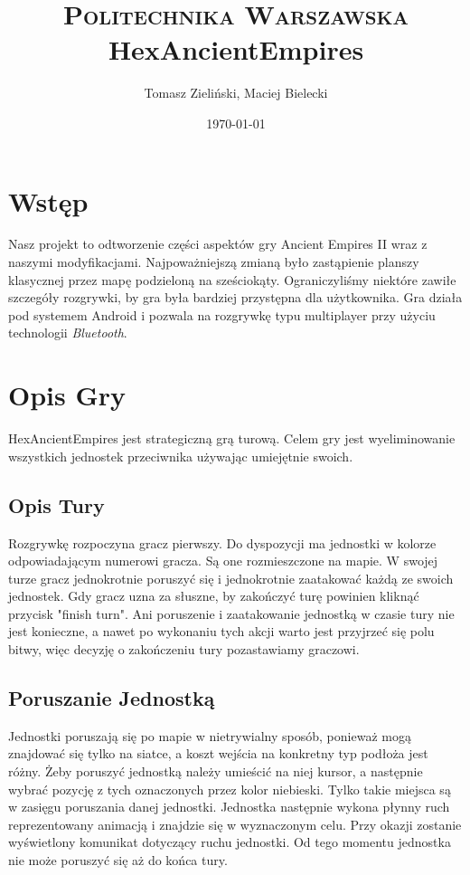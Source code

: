 \documentclass[paper=a4, fontsize=11pt]{scrartcl} %
\title{	
\normalfont \normalsize 
\textsc{Politechnika Warszawska} \\ [25pt] %
\huge HexAncientEmpires \\ %
}
\author{Tomasz Zieliński,  Maciej Bielecki}
\date{\normalsize\today}
\numberwithin{equation}{section} %
\numberwithin{figure}{section} %
\numberwithin{table}{section} %
\begin{document}
\maketitle 

\section{Wstęp}
Nasz projekt to odtworzenie części aspektów gry Ancient Empires II wraz z naszymi modyfikacjami. Najpoważniejszą zmianą było zastąpienie planszy klasycznej przez mapę podzieloną na sześciokąty. Ograniczyliśmy niektóre zawiłe szczegóły rozgrywki, by gra była bardziej przystępna dla użytkownika. Gra działa pod systemem Android i pozwala na rozgrywkę typu multiplayer przy użyciu technologii \textit{Bluetooth}.

\section{Opis Gry}
HexAncientEmpires jest strategiczną grą turową. Celem gry jest wyeliminowanie wszystkich jednostek przeciwnika używając umiejętnie swoich.
\subsection{Opis Tury}
Rozgrywkę rozpoczyna gracz pierwszy. Do dyspozycji ma jednostki w kolorze odpowiadającym numerowi gracza. Są one rozmieszczone na mapie.
 W swojej turze gracz jednokrotnie poruszyć się i jednokrotnie zaatakować każdą ze swoich jednostek. Gdy gracz uzna za słuszne, by zakończyć turę powinien kliknąć przycisk "finish turn". Ani poruszenie i zaatakowanie jednostką w czasie tury nie jest konieczne, a nawet po wykonaniu tych akcji warto jest przyjrzeć się polu bitwy, więc decyzję o zakończeniu tury pozastawiamy graczowi. 
\subsection{Poruszanie Jednostką}
Jednostki poruszają się po mapie w nietrywialny sposób, ponieważ mogą znajdować się tylko na siatce, a koszt wejścia na konkretny typ podłoża jest różny. Żeby poruszyć jednostką należy umieścić na niej kursor, a następnie wybrać pozycję z tych oznaczonych przez kolor niebieski. Tylko takie miejsca są w zasięgu poruszania danej jednostki. Jednostka następnie wykona płynny ruch reprezentowany animacją i znajdzie się w wyznaczonym celu. Przy okazji zostanie wyświetlony komunikat dotyczący ruchu jednostki. Od tego momentu jednostka nie może poruszyć się aż do końca tury. 
\end{document}
